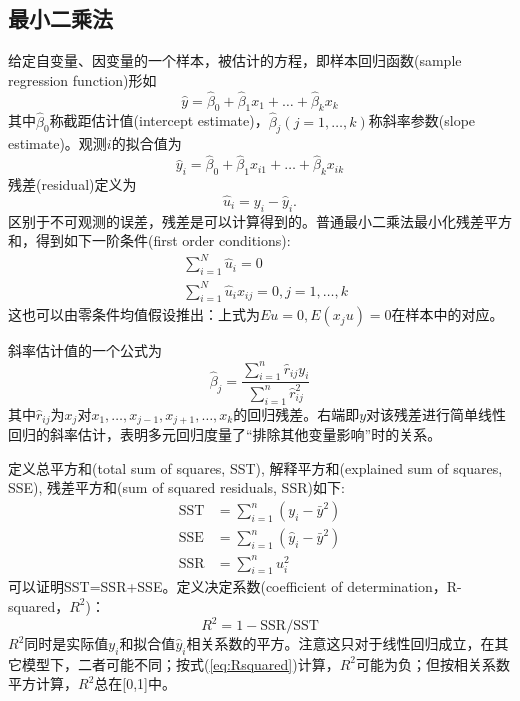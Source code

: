 \subsection{最小二乘法}

\par 给定自变量、因变量的一个样本，被估计的方程，即样本回归函数(sample regression function)形如
\begin{equation}
    \hat{y}=\hat{\beta}_0+\hat{\beta}_1 x_1+\dots+\hat{\beta}_k x_k
\end{equation}
其中$\hat{\beta}_0$称截距估计值(intercept estimate)，$\hat{\beta}_j(j=1,\dots,k)$称斜率参数(slope estimate)。观测$i$的拟合值为
\begin{equation}
    \hat{y}_i=\hat{\beta}_0+\hat{\beta}_1 x_{i1}+\dots+\hat{\beta}_k x_{ik}
\end{equation}
残差(residual)定义为
\begin{equation}
    \hat{u}_i = y_i-\hat{y}_i.
\end{equation}
区别于不可观测的误差，残差是可以计算得到的。普通最小二乘法最小化残差平方和，得到如下一阶条件(first order conditions):
\begin{align}
    &\sum_{i=1}^N \hat{u}_i=0\\
    &\sum_{i=1}^N \hat{u}_ix_{ij}=0, j=1,\dots,k
\end{align}
这也可以由零条件均值假设推出：上式为$Eu=0, E(x_ju)=0$在样本中的对应。

\par 斜率估计值的一个公式为
\begin{equation}
    \hat{\beta}_j=\frac{\sum_{i=1}^n \hat{r}_{ij}y_i}{\sum_{i=1}^n \hat{r}_{ij}^2}
\end{equation}
其中$\hat{r}_{ij}$为$x_j$对$x_1,\dots,x_{j-1},x_{j+1},\dots,x_k$的回归残差。右端即$y$对该残差进行简单线性回归的斜率估计，表明多元回归度量了“排除其他变量影响”时的关系。

\par 定义总平方和(total sum of squares, SST), 解释平方和(explained sum of squares, SSE), 残差平方和(sum of squared residuals, SSR)如下:
\begin{align}
    \text{SST}&=\sum_{i=1}^n (y_i-\bar{y}^2)\\
    \text{SSE}&=\sum_{i=1}^n (\hat{y}_i-\bar{y}^2)\\
    \text{SSR}&=\sum_{i=1}^n u_i^2
\end{align}
可以证明SST=SSR+SSE。定义决定系数(coefficient of determination，R-squared，$R^2$)：
\begin{equation}
    R^2=1-\text{SSR}/\text{SST}\label{eq:Rsquared}
\end{equation}
$R^2$同时是实际值$y_i$和拟合值$\hat{y}_i$相关系数的平方。注意这只对于线性回归成立，在其它模型下，二者可能不同；按式(\ref{eq:Rsquared})计算，$R^2$可能为负；但按相关系数平方计算，$R^2$总在[0,1]中。

